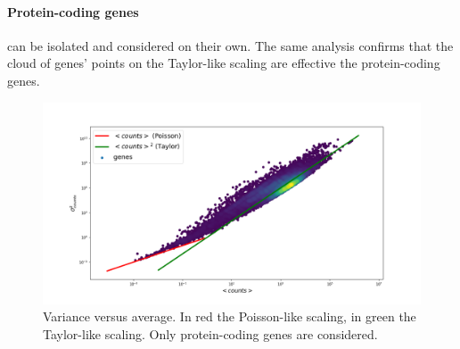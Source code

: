 \paragraph{Protein-coding genes} can be isolated and considered on their own. The same analysis confirms that the cloud of genes' points on the Taylor-like scaling are effective the protein-coding genes.
\begin{figure}[htb!]
    \centering
    \includegraphics[width=0.9\linewidth]{pictures/scalinglaws/gtex/varmean_loglog_density.png}
    \caption{Variance versus average. In \textcolor{pythonred}{red} the Poisson-like scaling, in \textcolor{pythongreen}{green} the Taylor-like scaling. Only protein-coding genes are considered.}
    \label{fig:scalinglaws/gtex/varmean_loglog_density}
\end{figure}


